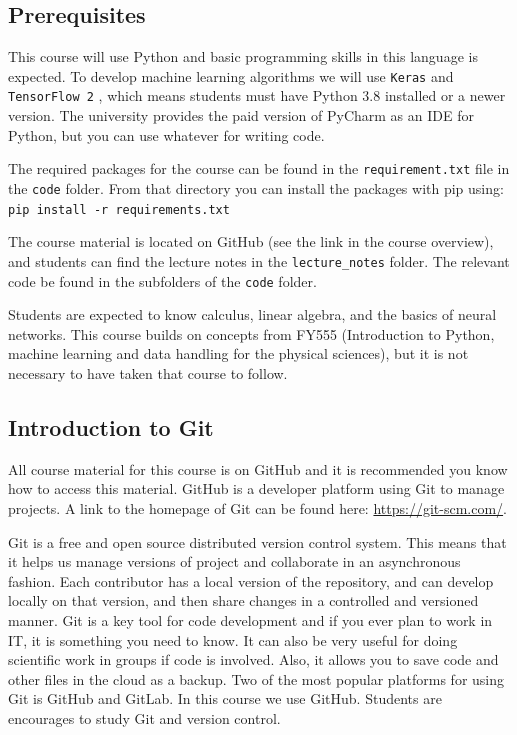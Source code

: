 \documentclass[12pt,a4paper]{article} %
\numberwithin{equation}{section}
\begin{document}
	\subsection{Prerequisites}
		This course will use Python and basic programming skills in this language is expected. To develop machine learning algorithms we will use \texttt{Keras} and \texttt{TensorFlow 2} \cite{chollet:2015keras, tensorflow:2015whitepaper}, which means students must have Python 3.8 installed or a newer version. The university provides the paid version of PyCharm as an IDE for Python, but you can use whatever for writing code.
		
		The required packages for the course can be found in the \texttt{requirement.txt} file in the \texttt{code} folder. From that directory you can install the packages with pip using: \texttt{pip install -r requirements.txt}
		
		The course material is located on GitHub (see the link in the course overview), and students can find the lecture notes in the \texttt{lecture\_notes} folder. The relevant code be found in the subfolders of the \texttt{code} folder.
		
		Students are expected to know calculus, linear algebra, and the basics of neural networks. This course builds on concepts from FY555 (Introduction to Python, machine learning and data handling for the physical sciences), but it is not necessary to have taken that course to follow.
		
	\subsection{Introduction to Git}
		All course material for this course is on GitHub and it is recommended you know how to access this material. GitHub is a developer platform using Git to manage projects. A link to the homepage of Git can be found here: \url{https://git-scm.com/}.
		
		Git is a free and open source distributed version control system. This means that it helps us manage versions of project and collaborate in an asynchronous fashion. Each contributor has a local version of the repository, and can develop locally on that version, and then share changes in a controlled and versioned manner. Git is a key tool for code development and if you ever plan to work in IT, it is something you need to know. It can also be very useful for doing scientific work in groups if code is involved. Also, it allows you to save code and other files in the cloud as a backup. Two of the most popular platforms for using Git is GitHub and GitLab. In this course we use GitHub. Students are encourages to study Git and version control.
		
\end{document}
